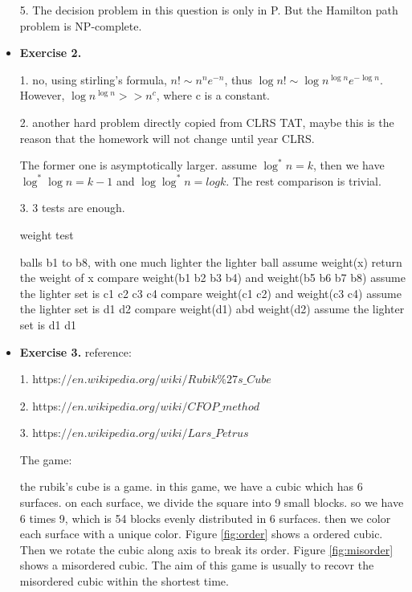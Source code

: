 \documentclass{article}
\begin{document}
\begin{itemize}
5. The decision problem in this question is only in P. But the Hamilton path problem is NP-complete.

\item \textbf{Exercise 2.}

1. no, using stirling's formula, $n ! \sim  n^{n} e^{-n}$, thus $\log n ! \sim  \log n^{\log n} e^{-\log n}$. However, $\log n^{\log n} >> n^c$, where c is a constant.

2. another hard problem directly copied from CLRS TAT, maybe this is the reason that the homework will not change until year CLRS.

The former one is asymptotically larger. assume $\log^* n = k$, then we have $\log ^{*} \log n = k - 1$ and $\log \log ^{*} n = log k$. The rest comparison is trivial.

3. 3 tests are enough. 

\begin{algorithm}[H]  
    \caption{weight test}  
    \begin{algorithmic}[1]  
         balls b1 to b8, with one much lighter
        \Ensure the lighter ball
        \State assume weight(x) return the weight of x
        \State compare weight(b1 b2 b3 b4) and weight(b5 b6 b7 b8)
        \State assume the lighter set is c1 c2 c3 c4
        \State compare weight(c1 c2) and weight(c3 c4)
        \State assume the lighter set is d1 d2
        \State compare weight(d1) abd weight(d2)
        \State assume the lighter set is d1
        \State \Return d1
    \end{algorithmic}  
\end{algorithm}

\item \textbf{Exercise 3.}
reference: 

1. https:$//en.wikipedia.org/wiki/Rubik\%27s\_Cube$

2. https:$//en.wikipedia.org/wiki/CFOP\_method$

3. https:$//en.wikipedia.org/wiki/Lars\_Petrus$

The game:

the rubik's cube is a game. in this game, we have a cubic which has 6 surfaces. on each surface, we divide the square into 9 small blocks. so we have 6 times 9, which is 54 blocks evenly distributed in 6 surfaces. then we color each surface with a unique color. Figure \ref{fig:order} shows a ordered cubic. Then we rotate the cubic along axis to break its order. Figure \ref{fig:misorder} shows a misordered cubic. The aim of this game is usually to recovr the misordered cubic within the shortest time. 


\end{itemize}
\end{document}
